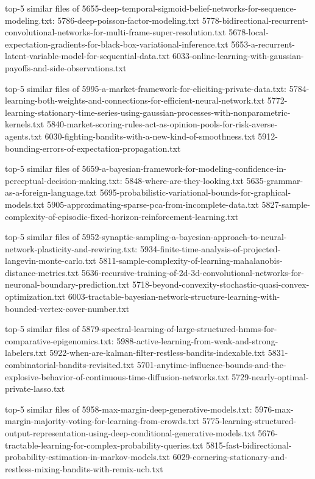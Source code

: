 \documentclass[11pt]{article}
\begin{document}
top-5 similar files of
5655-deep-temporal-sigmoid-belief-networks-for-sequence-modeling.txt:
5786-deep-poisson-factor-modeling.txt
5778-bidirectional-recurrent-convolutional-networks-for-multi-frame-super-resolution.txt
5678-local-expectation-gradients-for-black-box-variational-inference.txt
5653-a-recurrent-latent-variable-model-for-sequential-data.txt
6033-online-learning-with-gaussian-payoffs-and-side-observations.txt

top-5 similar files of
5995-a-market-framework-for-eliciting-private-data.txt:
5784-learning-both-weights-and-connections-for-efficient-neural-network.txt
5772-learning-stationary-time-series-using-gaussian-processes-with-nonparametric-kernels.txt
5840-market-scoring-rules-act-as-opinion-pools-for-risk-averse-agents.txt
6030-fighting-bandits-with-a-new-kind-of-smoothness.txt
5912-bounding-errors-of-expectation-propagation.txt

top-5 similar files of
5659-a-bayesian-framework-for-modeling-confidence-in-perceptual-decision-making.txt:
5848-where-are-they-looking.txt 5635-grammar-as-a-foreign-language.txt
5695-probabilistic-variational-bounds-for-graphical-models.txt
5905-approximating-sparse-pca-from-incomplete-data.txt
5827-sample-complexity-of-episodic-fixed-horizon-reinforcement-learning.txt

top-5 similar files of
5952-synaptic-sampling-a-bayesian-approach-to-neural-network-plasticity-and-rewiring.txt:
5934-finite-time-analysis-of-projected-langevin-monte-carlo.txt
5811-sample-complexity-of-learning-mahalanobis-distance-metrics.txt
5636-recursive-training-of-2d-3d-convolutional-networks-for-neuronal-boundary-prediction.txt
5718-beyond-convexity-stochastic-quasi-convex-optimization.txt
6003-tractable-bayesian-network-structure-learning-with-bounded-vertex-cover-number.txt

top-5 similar files of
5879-spectral-learning-of-large-structured-hmms-for-comparative-epigenomics.txt:
5988-active-learning-from-weak-and-strong-labelers.txt
5922-when-are-kalman-filter-restless-bandits-indexable.txt
5831-combinatorial-bandits-revisited.txt
5701-anytime-influence-bounds-and-the-explosive-behavior-of-continuous-time-diffusion-networks.txt
5729-nearly-optimal-private-lasso.txt

top-5 similar files of 5958-max-margin-deep-generative-models.txt:
5976-max-margin-majority-voting-for-learning-from-crowds.txt
5775-learning-structured-output-representation-using-deep-conditional-generative-models.txt
5676-tractable-learning-for-complex-probability-queries.txt
5815-fast-bidirectional-probability-estimation-in-markov-models.txt
6029-cornering-stationary-and-restless-mixing-bandits-with-remix-ucb.txt
\end{document}
